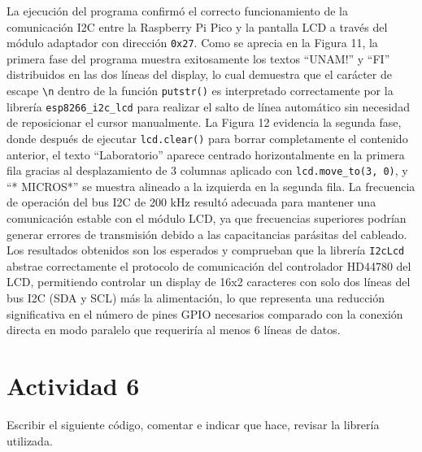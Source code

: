 \documentclass[letterpaper,12pt]{article}
\begin{document}
    La ejecución del programa confirmó el correcto funcionamiento de la comunicación I2C entre la Raspberry Pi Pico y la pantalla LCD a través del módulo adaptador con dirección \texttt{0x27}. Como se aprecia en la Figura 11, la primera fase del programa muestra exitosamente los textos ``UNAM!'' y ``FI'' distribuidos en las dos líneas del display, lo cual demuestra que el carácter de escape \texttt{\textbackslash n} dentro de la función \texttt{putstr()} es interpretado correctamente por la librería \texttt{esp8266\_i2c\_lcd} para realizar el salto de línea automático sin necesidad de reposicionar el cursor manualmente. La Figura 12 evidencia la segunda fase, donde después de ejecutar \texttt{lcd.clear()} para borrar completamente el contenido anterior, el texto ``Laboratorio'' aparece centrado horizontalmente en la primera fila gracias al desplazamiento de 3 columnas aplicado con \texttt{lcd.move\_to(3, 0)}, y ``* MICROS*'' se muestra alineado a la izquierda en la segunda fila. La frecuencia de operación del bus I2C de 200 kHz resultó adecuada para mantener una comunicación estable con el módulo LCD, ya que frecuencias superiores podrían generar errores de transmisión debido a las capacitancias parásitas del cableado. Los resultados obtenidos son los esperados y comprueban que la librería \texttt{I2cLcd} abstrae correctamente el protocolo de comunicación del controlador HD44780 del LCD, permitiendo controlar un display de 16x2 caracteres con solo dos líneas del bus I2C (SDA y SCL) más la alimentación, lo que representa una reducción significativa en el número de pines GPIO necesarios comparado con la conexión directa en modo paralelo que requeriría al menos 6 líneas de datos.

\section*{Actividad 6}

\noindent Escribir el siguiente c\'odigo, comentar e indicar que hace, revisar la librer\'ia utilizada.
\end{document}
